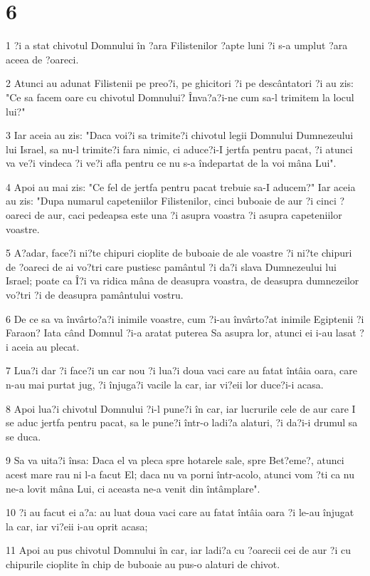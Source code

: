 \chapter{6}

\par 1 ?i a stat chivotul Domnului în ?ara Filistenilor ?apte luni ?i s-a umplut ?ara aceea de ?oareci.
\par 2 Atunci au adunat Filistenii pe preo?i, pe ghicitori ?i pe descântatori ?i au zis: "Ce sa facem oare cu chivotul Domnului? Înva?a?i-ne cum sa-l trimitem la locul lui?"
\par 3 Iar aceia au zis: "Daca voi?i sa trimite?i chivotul legii Domnului Dumnezeului lui Israel, sa nu-l trimite?i fara nimic, ci aduce?i-I jertfa pentru pacat, ?i atunci va ve?i vindeca ?i ve?i afla pentru ce nu s-a îndepartat de la voi mâna Lui".
\par 4 Apoi au mai zis: "Ce fel de jertfa pentru pacat trebuie sa-I aducem?" Iar aceia au zis: "Dupa numarul capeteniilor Filistenilor, cinci buboaie de aur ?i cinci ?oareci de aur, caci pedeapsa este una ?i asupra voastra ?i asupra capeteniilor voastre.
\par 5 A?adar, face?i ni?te chipuri cioplite de buboaie de ale voastre ?i ni?te chipuri de ?oareci de ai vo?tri care pustiesc pamântul ?i da?i slava Dumnezeului lui Israel; poate ca Î?i va ridica mâna de deasupra voastra, de deasupra dumnezeilor vo?tri ?i de deasupra pamântului vostru.
\par 6 De ce sa va învârto?a?i inimile voastre, cum ?i-au învârto?at inimile Egiptenii ?i Faraon? Iata când Domnul ?i-a aratat puterea Sa asupra lor, atunci ei i-au lasat ?i aceia au plecat.
\par 7 Lua?i dar ?i face?i un car nou ?i lua?i doua vaci care au fatat întâia oara, care n-au mai purtat jug, ?i înjuga?i vacile la car, iar vi?eii lor duce?i-i acasa.
\par 8 Apoi lua?i chivotul Domnului ?i-l pune?i în car, iar lucrurile cele de aur care I se aduc jertfa pentru pacat, sa le pune?i într-o ladi?a alaturi, ?i da?i-i drumul sa se duca.
\par 9 Sa va uita?i însa: Daca el va pleca spre hotarele sale, spre Bet?eme?, atunci acest mare rau ni l-a facut El; daca nu va porni într-acolo, atunci vom ?ti ca nu ne-a lovit mâna Lui, ci aceasta ne-a venit din întâmplare".
\par 10 ?i au facut ei a?a: au luat doua vaci care au fatat întâia oara ?i le-au înjugat la car, iar vi?eii i-au oprit acasa;
\par 11 Apoi au pus chivotul Domnului în car, iar ladi?a cu ?oarecii cei de aur ?i cu chipurile cioplite în chip de buboaie au pus-o alaturi de chivot.
